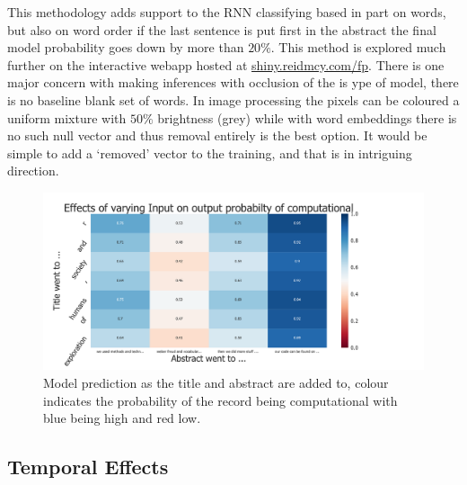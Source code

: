 \documentclass[12pt, a4paper]{article}
\begin{document}
This methodology adds support to the RNN classifying based in part on words, but also on word order if the last sentence is put first in the abstract the final model probability goes down by more than $20\%$. This method is explored much further on the interactive webapp hosted at \href{shiny.reidmcy.com/fp}{shiny.reidmcy.com/fp}. There is one major concern with making inferences with occlusion of the is ype of model, there is no baseline blank set of words. In image processing the pixels can be coloured a uniform mixture with $50\%$ brightness (grey) while with word embeddings there is no such null vector and thus removal entirely is the best option. It would be simple to add a `removed' vector to the training, and that is in intriguing direction.  

\begin{figure}[H]
	\centering
	\includegraphics[width=1\textwidth]{occ}
	\caption{Model prediction as the title and abstract are added to, colour indicates the probability of the record being computational with blue being high and red low.}\label{oc1}
\end{figure}

\subsection{Temporal Effects}
\end{document}
